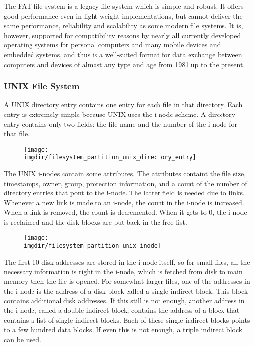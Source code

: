 \documentclass[a4paper, twoside]{article}
\newcommand{\imgdir}{../resources/images} %
\begin{document}
The FAT file system is a legacy file system which is simple and robust. It offers good performance even in light-weight implementations, but cannot deliver the same performance, reliability and scalability as some modern file systems. It is, however, supported for compatibility reasons by nearly all currently developed operating systems for personal computers and many mobile devices and embedded systems, and thus is a well-suited format for data exchange between computers and devices of almost any type and age from 1981 up to the present.

\subsubsection{UNIX File System}
A UNIX directory entry contains one entry for each file in that directory. Each entry is extremely simple because UNIX uses the i-node scheme. A directory entry contains only two fields: the file name and the number of the i-node for that file. 

\begin{figure}[H]
	\centering
	\texttt{[image: \\imgdir/filesystem\_partition\_unix\_directory\_entry]}
	\label{fig:filesystem_partition_unix_directory_entry}
\end{figure}

The UNIX i-nodes contain some attributes. The attributes containt the file size, timestamps, owner, group, protection information, and a count of the number of directory entries that pont to the i-node. The latter field is needed due to links. Whenever a new link is made to an i-node, the count in the i-node is increased. When a link is removed, the count is decremented. When it gets to 0, the i-node is reclaimed and the disk blocks are put back in the free list.

\begin{figure}[H]
	\centering
	\texttt{[image: \\imgdir/filesystem\_partition\_unix\_inode]}
	\label{fig:filesystem_partition_unix_inode}
\end{figure}

The first 10 disk addresses are stored in the i-node itself, so for small files, all the necessary information is right in the i-node, which is fetched from disk to main memory then the file is opened. For somewhat larger files, one of the addresses in the i-node is the address of a disk block called a single indirect block. This block contains additional disk addresses. If this still is not enough, another address in the i-node, called a double indirect block, contains the address of a block that contains a list of single indirect blocks. Each of these single indirect blocks points to a few hundred data blocks. If even this is not enough, a triple indirect block can be used.
\end{document}
